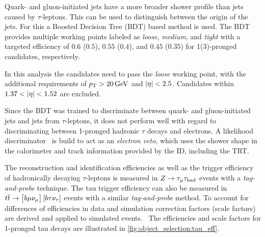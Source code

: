 Quark- and gluon-initiated jets have a more broader shower profile than jets caused by $\tau$-leptons.
This can be used to distinguish between the origin of the jets.
For this a Boosted Decision Tree (BDT) based method is used.
The BDT provides multiple working points labeled as \emph{loose}, \emph{medium}, and \emph{tight}
with a targeted efficiency of $0.6$ ($0.5$), $0.55$ ($0.4$), and $0.45$ ($0.35$) for 1(3)-pronged \tauhadvis{} candidates, respectively.

In this analysis the \tauhadvis{} candidates need to pass the \emph{loose} working point, with the additional requirements
of $\pt > \unit[20]{GeV}$ and $\left|\eta\right| < 2.5$.
Candidates within $1.37 < \left|\eta\right| < 1.52$ are excluded.

Since the BDT was trained to discriminate between quark- and gluon-initiated jets and jets from $\tau$-leptons, it
does not perform well with regard to discriminating between 1-pronged hadronic $\tau$ decays and electrons.
A likelihood discriminator~\cite{Run1TauPaper} is build to act as an \emph{electron veto}, which uses the shower shape in the calorimeter
and track information provided by the ID, including the TRT\@.

The reconstruction and identification efficiencies as well as the trigger efficiency of hadronically decaying $\tau$-leptons is measured in
$Z \to \tau_\mu \tau_\text{had}$ events with a \emph{tag-and-probe} technique.
The tau trigger efficiency can also be measured in $t\overline{t} \to \left[b\mu\nu_\mu\right]\left[b\tau\nu_\tau\right]$ events
with a similar \emph{tag-and-probe} method.
To account for differences of efficiencies in data and simulation correction factors (scale factors) are derived and applied to simulated
events.~\cite{ATL-PHYS-PUB-2015-045,ATLAS-CONF-2017-029}
The efficiencies and scale factors for 1-pronged tau decays are illustrated in \cref{fig:object_selection:tau_eff}.

